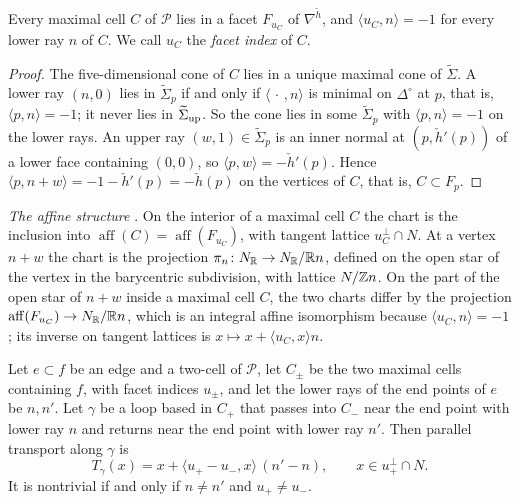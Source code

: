 \begin{lemma}\label{lem:label}
Every maximal cell $C$ of $\mathscr P$ lies in a facet $F_{u_C}$ of $\nabla^{\check h}$, and $\langle u_C,n\rangle=-1$ for every
lower ray $n$ of $C$. We call $u_C$ the \emph{facet index} of $C$.
\end{lemma}

\begin{proof}
The five-dimensional cone of $C$ lies in a unique maximal cone of $\widetilde\Sigma$. A lower ray $(n,0)$ lies in
$\widetilde\Sigma_p$ if and only if $\langle\,\cdot\,,n\rangle$ is minimal on $\Delta^\circ$ at $p$, that is,
$\langle p,n\rangle=-1$; it never lies in $\widetilde\Sigma_{\rm up}$. So the cone lies in some $\widetilde\Sigma_p$ with
$\langle p,n\rangle=-1$ on the lower rays. An upper ray $(w,1)\in\widetilde\Sigma_p$ is an inner normal at $(p,\check h'(p))$ of a
lower face containing $(0,0)$, so $\langle p,w\rangle=-\check h'(p)$. Hence $\langle p,n+w\rangle=-1-\check h'(p)=-\check h(p)$ on
the vertices of $C$, that is, $C\subset F_p$.
\end{proof}

\emph{The affine structure} \cite[Prop.~3.14]{Gross2005}. On the interior of a maximal cell $C$ the chart is the inclusion
into $\operatorname{aff}(C)=\operatorname{aff}(F_{u_C})$, with tangent lattice $u_C^\perp\cap N$. At a vertex $n+w$ the chart is
the projection $\pi_n\colon N_\mathbb R\to N_\mathbb R/\mathbb R n$, defined on the open star of the vertex in the barycentric subdivision, with
lattice $N/\mathbb Z n$. On the part of the open star of $n+w$ inside a maximal cell $C$, the two charts differ by the projection
$\operatorname{aff}(F_{u_C})\to N_\mathbb R/\mathbb R n$, which is an integral affine isomorphism because $\langle u_C,n\rangle=-1$; its inverse
on tangent lattices is $x\mapsto x+\langle u_C,x\rangle n$.

\begin{lemma}\label{lem:monodromy}
Let $e\subset f$ be an edge and a two-cell of $\mathscr P$, let $C_\pm$ be the two maximal cells containing $f$, with facet
indices $u_\pm$, and let the lower rays of the end points of $e$ be $n,n'$. Let $\gamma$ be a loop based in $C_+$ that passes
into $C_-$ near the end point with lower ray $n$ and returns near the end point with lower ray $n'$. Then parallel transport
along $\gamma$ is
\[
T_\gamma(x)=x+\langle u_+-u_-,x\rangle\,(n'-n),\qquad x\in u_+^\perp\cap N.
\]
It is nontrivial if and only if $n\neq n'$ and $u_+\neq u_-$.
\end{lemma}

